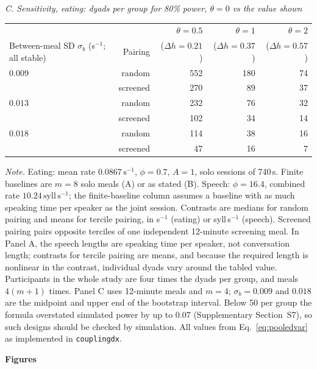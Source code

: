\documentclass[12pt]{article}
\begin{document}
\vspace{0.08in}
\noindent\emph{C. Sensitivity, eating: dyads per group for 80\% power, $\theta=0$ vs the value shown}

\vspace{0.05in}
\noindent\begin{tabular}{lrrrr}
\toprule
& & $\theta=0.5$ & $\theta=1$ & $\theta=2$\\
Between-meal SD $\sigma_b$ (s$^{-1}$; all stable) & Pairing & ($\Delta h=0.21$) & ($\Delta h=0.37$) & ($\Delta h=0.57$)\\
\midrule
$0.009$ & random & 552 & 180 & 74\\
 & screened & 270 & 89 & 37\\
$0.013$ & random & 232 & 76 & 32\\
 & screened & 102 & 34 & 14\\
$0.018$ & random & 114 & 38 & 16\\
 & screened & 47 & 16 & 7\\
\bottomrule
\end{tabular}
\endgroup

\vspace{0.1in}
{\singlespacing\small\noindent\emph{Note.} Eating: mean rate $0.0867\,\mathrm{s}^{-1}$,
$\phi=0.7$, $A=1$, solo sessions of 740\,s. Finite baselines are $m=8$ solo meals
(A) or as stated (B). Speech: $\phi=16.4$, combined rate
$10.24\,\mathrm{syll\,s^{-1}}$; the finite-baseline column assumes a baseline
with as much speaking time per speaker as the joint session. Contrasts are medians for random pairing and means for
tercile pairing, in s$^{-1}$ (eating) or syll\,s$^{-1}$ (speech). Screened
pairing pairs opposite terciles of one independent 12-minute screening meal. In
Panel A, the speech lengths are speaking time per speaker, not conversation
length; contrasts for tercile pairing are means, and because the required length
is nonlinear in the contrast, individual dyads vary around the tabled value.
Participants in the whole study are four times the dyads per group, and meals
$4(m+1)$ times. Panel C uses 12-minute meals and $m=4$; $\sigma_b=0.009$ and $0.018$ are the
midpoint and upper end of the bootstrap interval. Below 50 per group the formula
overstated simulated power by up to 0.07 (Supplementary Section~S7), so such
designs should be checked by simulation.
All values from Eq.~\eqref{eq:pooledvar} as implemented in \texttt{couplingdx}.\par}

\newpage

\begin{center}\textbf{Figures}\end{center}
\end{document}
